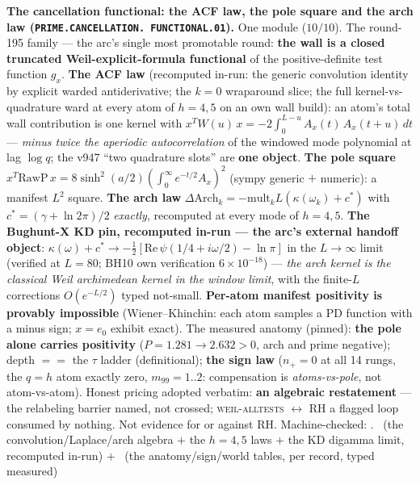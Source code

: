 \par\smallskip\noindent\textbf{The cancellation functional: the
ACF law, the pole square and the arch law
(\texttt{PRIME.\allowbreak CANCELLATION.\allowbreak
FUNCTIONAL.01}).}
One module ($10/10$).  The round-195 family --- the arc's single
most promotable round: \textbf{the wall is a closed truncated
Weil-explicit-formula functional} of the positive-definite test
function $g_x$.  \textbf{The ACF law} (recomputed in-run: the
generic convolution identity by explicit warded antiderivative;
the $k = 0$ wraparound slice; the full kernel-vs-quadrature ward
at every atom of $h = 4, 5$ on an own wall build): an atom's
total wall contribution is one kernel with $x^T W(u)\,x =
-2\int_0^{L-u} A_x(t)\,A_x(t + u)\,dt$ --- \emph{minus twice the
aperiodic autocorrelation} of the windowed mode polynomial at lag
$\log q$; the v947 ``two quadrature slots'' are \textbf{one
object}.  \textbf{The pole square} $x^T \mathrm{RawP}\,x =
8\sinh^2(a/2)(\int_0^\infty e^{-t/2} A_x)^2$ (sympy generic $+$
numeric): a manifest $L^2$ square.  \textbf{The arch law}
$\Delta\mathrm{Arch}_k = -\mathrm{mult}_k L(\kappa(\omega_k) +
c^*)$ with $c^* = (\gamma + \ln 2\pi)/2$ \emph{exactly},
recomputed at every mode of $h = 4, 5$.  \textbf{The Bughunt-X KD
pin, recomputed in-run --- the arc's external handoff object}:
$\kappa(\omega) + c^* \to -\tfrac12[\mathrm{Re}\,\psi(1/4 +
i\omega/2) - \ln\pi]$ in the $L \to \infty$ limit (verified at
$L = 80$; BH10 own verification $6\times10^{-18}$) --- \emph{the
arch kernel is the classical Weil archimedean kernel in the
window limit}, with the finite-$L$ corrections $O(e^{-L/2})$
typed not-small.  \textbf{Per-atom manifest positivity is
provably impossible} (Wiener--Khinchin: each atom samples a PD
function with a minus sign; $x = e_0$ exhibit exact).  The
measured anatomy (pinned): \textbf{the pole alone carries
positivity} ($P = 1.281 \to 2.632 > 0$, arch and prime negative);
depth $==$ the $\tau$ ladder (definitional); \textbf{the sign
law} ($n_+ = 0$ at all 14 rungs, the $q = h$ atom exactly zero,
$m_{99} = 1..2$: compensation is \emph{atoms-vs-pole}, not
atom-vs-atom).  Honest pricing adopted verbatim: \textbf{an
algebraic restatement} --- the relabeling barrier named, not
crossed; \textsc{weil-alltests} $\leftrightarrow$ RH a flagged
loop consumed by nothing.  Not evidence for or against RH.
Machine-checked: .
\mE\ (the convolution/Laplace/arch algebra $+$ the $h = 4, 5$
laws $+$ the KD digamma limit, recomputed in-run) $+$ \mC\ (the
anatomy/sign/world tables, per record, typed measured)
\par\smallskip


